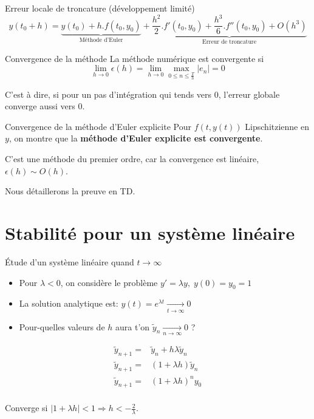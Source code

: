 \documentclass{beamer}
\begin{document}
\begin{frame}{Erreur locale de troncature (développement limité)}
    \[y(t_0 + h) = \underbrace{y(t_0) + h.f(t_0, y_0)}_{\text{Méthode d'Euler}} + \underbrace{\frac{h^2}{2}.f'(t_0, y_0) + \frac{h^3}{6}.f''(t_0, y_0) + O(h^3)}_{\text{Erreur de troncature}}\]
\end{frame}

\begin{frame}{Convergence de la méthode}
    La méthode numérique est convergente si
    \[\lim_{h \rightarrow 0} \epsilon(h) = \lim_{h \rightarrow 0} \max_{0 \leq n \leq \frac{T}{h}} |e_n| = 0 \]

    C'est à dire, si pour un pas d'intégration qui tends vers 0, l'erreur globale converge aussi vers 0.

\end{frame}


\begin{frame}{Convergence de la méthode d'Euler explicite}
    Pour $f(t,y(t))$ Lipschitzienne en $y$, on montre que la \textbf{méthode d'Euler explicite est convergente}.

    C'est une méthode du premier ordre, car la convergence est linéaire, $\epsilon(h) \sim O(h)$.

    Nous détaillerons la preuve en TD.

\end{frame}


\section{Stabilité pour un système linéaire}

\begin{frame}{Étude d'un système linéaire quand $t \rightarrow \infty$}
    \begin{itemize}
        \item Pour $\lambda < 0 $, on considère le problème $ y'=\lambda y,\; y(0) = y_0 = 1$
        \item La solution analytique est: $ y(t) = e^{\lambda t} \xrightarrow[t \rightarrow \infty]{} 0$

        \item Pour-quelles valeurs de $h$ aura t'on $\widetilde{y}_n \xrightarrow[n \rightarrow \infty]{} 0$ ?
    \end{itemize}
    \vfill
    \begin{align*}
        \widetilde{y}_{n+1} = & \widetilde{y}_n + h\lambda\widetilde{y}_n \\
        \widetilde{y}_{n+1} = & (1+\lambda h)\widetilde{y}_n              \\
        \widetilde{y}_{n+1} = & (1+\lambda h)^ny_0                        \\
    \end{align*}

    Converge si $|1+\lambda h| < 1 \Rightarrow h < -\frac{2}{\lambda}$.
\end{frame}
\end{document}
